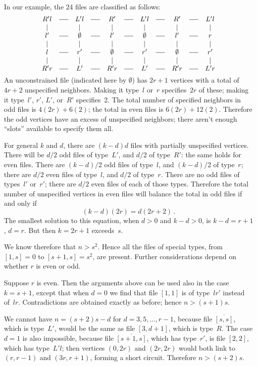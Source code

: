 In our example, the 24 files are classified as follows:
$$\vcenter{\halign{%
$\hfil#\hfil$\quad%
&$\hfil#\hfil$\quad%
&$\hfil#\hfil$\quad&$\hfil#\hfil$\quad&$\hfil#\hfil$\quad&$\hfil#\hfil$\quad%
&$\hfil#\hfil$\quad&$\hfil#\hfil$\quad&$\hfil#\hfil$\quad&$\hfil#\hfil$\quad%
&$\hfil#\hfil$\cr
R'l&\longdash&L'l&\longdash&R'&\longdash&L'l&\longdash&R'&\longdash&L'l\cr
\vert&&\vert&&\vert&&\vert&&\vert&&\vert\cr
l'&\longdash&\emptyset&\longdash&l'&\longdash&\emptyset&\longdash&l'%
&\longdash&r\cr
\vert&&\vert&&\vert&&\vert&&\vert&&\vert\cr
l&\longdash&r'&\longdash&\emptyset&\longdash&r'&\longdash%
&\emptyset&\longdash&r'\cr
\vert&&\vert&&\vert&&\vert&&\vert&&\vert\cr
R'r&\longdash&L'&\longdash&R'r&\longdash&L'&\longdash&R'r&\longdash&L'r\cr}}$$
An unconstrained file (indicated here by $\emptyset$) has $2r+1$ vertices with
a total of $4r+2$ unspecified neighbors. Making it type~$l$ or~$r$
specifies~$2r$ of these; making it type~$l'$, $r'$, $L'$, or~$R'$ specifies~2.
The total number of specified neighbors in odd files is
$4(2r)+6(2)$; the total in even files  is $6(2r)+12(2)$. Therefore
the odd vertices have an excess of unspecified neighbors; there aren't enough
``slots'' available to specify them all.

For general $k$ and $d$, there are $(k-d)d$ files with partially unspecified
vertices. There will be $d/2$ odd files of type~$L'$, and $d/2$ of type~$R'$:
the same holds for even files. There are $(k-d)/2$ odd files of type~$l$, and
$(k-d)/2$ of type~$r$; there are $d/2$ even files of type~$l$, and $d/2$ of
type~$r$. There are no odd files of types~$l'$ or~$r'$; there are $d/2$ even
files of each of those types. Therefore the total number of unspecified
vertices in even files will balance the total in odd files if and only if
$$(k-d)(2r)=d(2r+2)\,.$$
The smallest solution to this equation, when $d>0$ and $k-d>0$, is $k-d=r+1$,
$d=r$. But then $k=2r+1$ exceeds~$s$.

We know therefore that $n>s^2$. Hence all the files of special types, from
$[1,s]=0$ to $[s+1,s]=s^2$, are present. Further considerations depend on
whether $r$ is even or odd.

Suppose $r$ is even. Then the arguments above can be used also in the case
$k=s+1$, except that when $d=0$ we find that file $[1,1]$ is of type~$lr'$
instead of~$lr$. Contradictions are obtained exactly as before; hence
$n>(s+1)s$. 

We cannot have $n=(s+2)s-d$ for $d=3,5,\ldots,r-1$, because file
$\overline{[s,s]}$, which is type~$L'$, would be the same as file $[3,d+1]$,
which is type~$R$. The case $d=1$ is also impossible, because file
$\overline{[s+1,s]}$, which has type~$r'$, is file $[2,2]$, which has
type~$L'l$; then vertices $(0,2r)$ and $(2r,2r)$ would both link to $(r,r-1)$
and $(3r,r+1)$, forming a short circuit. Therefore $n>(s+2)s$.

